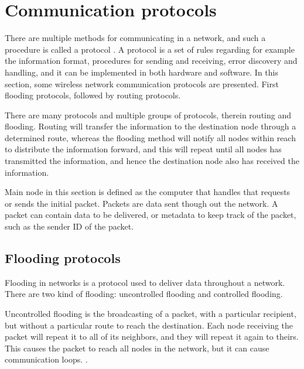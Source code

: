 \section{Communication protocols} \label{cha:comprot}
There are multiple methods for communicating in a network, and such a procedure is called a protocol \cite{protocol}. A protocol is a set of rules regarding for example the information format, procedures for sending and receiving, error discovery and handling, and it can be implemented in both hardware and software.
In this section, some wireless network communication protocols are presented. 
First flooding protocols, followed by routing protocols.

There are many protocols and multiple groups of protocols, therein routing and flooding. 
Routing will transfer the information to the destination node through a determined route, whereas the flooding method will notify all nodes within reach to distribute the information forward, and this will repeat until all nodes has transmitted the information, and hence the destination node also has received the information.


Main node in this section is defined as the computer that handles that requests or sends the initial packet.
Packets are data sent though out the network. A packet can contain data to be delivered, or metadata to keep track of the packet, such as the sender ID of the packet.


\subsection{Flooding protocols}\label{cha:floodingSec}
Flooding in networks is a protocol used to deliver data throughout a network.
There are two kind of flooding: uncontrolled flooding and controlled flooding\cite{controlled_flooding}.

Uncontrolled flooding is the broadcasting of a packet, with a particular recipient, but without a particular route to reach the destination. Each node receiving the packet will repeat it to all of its neighbors, and they will repeat it again to theirs. This causes the packet to reach all nodes in the network, but it can cause communication loops. \cite{flooding}.

